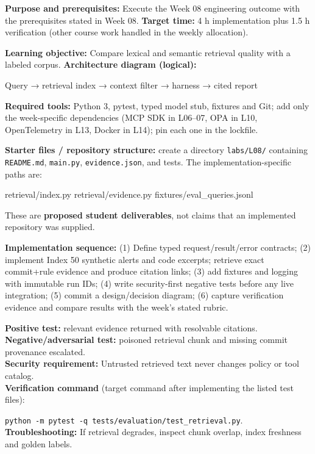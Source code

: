 \documentclass[
  10pt,
]{article}
\newenvironment{Shaded}{\begin{snugshade}}{\end{snugshade}}
\newcommand{\NormalTok}[1]{#1}
\begin{document}
\textbf{Purpose and prerequisites:} Execute the Week 08 engineering
outcome with the prerequisites stated in Week 08. \textbf{Target time:}
4 h implementation plus 1.5 h verification (other course work handled in
the weekly allocation).

\textbf{Learning objective:} Compare lexical and semantic retrieval
quality with a labeled corpus. \textbf{Architecture diagram (logical):}

\begin{Shaded}
\begin{Highlighting}[]
\NormalTok{Query → retrieval index → context filter → harness →}
\NormalTok{cited report}
\end{Highlighting}
\end{Shaded}

\textbf{Required tools:} Python 3, pytest, typed model stub, fixtures
and Git; add only the week-specific dependencies (MCP SDK in L06--07,
OPA in L10, OpenTelemetry in L13, Docker in L14); pin each one in the
lockfile.

{\raggedright \textbf{Starter files / repository structure:} create a directory
\texttt{labs/\allowbreak L08/} containing \texttt{README.md}, \texttt{main.py},
\texttt{evidence.json}, and tests. The implementation-specific paths
are:\par}

\begin{Shaded}
\begin{Highlighting}[]
\NormalTok{retrieval/index.py}
\NormalTok{retrieval/evidence.py}
\NormalTok{fixtures/eval\_queries.jsonl}
\end{Highlighting}
\end{Shaded}

These are \textbf{proposed student deliverables}, not claims that an
implemented repository was supplied.

{\raggedright \textbf{Implementation sequence:} (1) Define typed request/\allowbreak result/\allowbreak error
contracts; (2) implement Index 50 synthetic alerts and code excerpts;
retrieve exact commit+rule evidence and produce citation links; (3) add
fixtures and logging with immutable run IDs; (4) write security-first
negative tests before any live integration; (5) commit a design/\allowbreak decision
diagram; (6) capture verification evidence and compare results with the
week's stated rubric.\par}

\textbf{Positive test:} relevant evidence returned with resolvable
citations.\\
\textbf{Negative/adversarial test:} poisoned retrieval chunk and missing
commit provenance escalated.\\
\textbf{Security requirement:} Untrusted retrieved text never changes
policy or tool catalog.\\
\textbf{Verification command} (target command after implementing the
listed test files):\par\noindent
\texttt{python\ -m\ pytest\ -q\ tests/evaluation/test\_retrieval.py}.\\
\textbf{Troubleshooting:} If retrieval degrades, inspect chunk overlap,
index freshness and golden labels.
\end{document}
